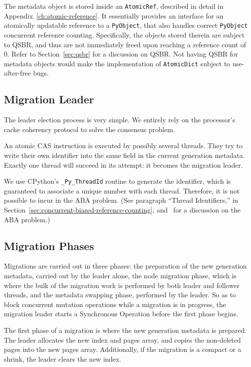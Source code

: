The metadata object is stored inside an \texttt{AtomicRef}, described in detail in Appendix~\ref{ch:atomic-reference}.
It essentially provides an interface for an atomically updatable reference to a \texttt{PyObject}, that also handles correct \texttt{PyObject} concurrent reference counting.
Specifically, the objects stored therein are subject to QSBR, and thus are not immediately freed upon reaching a reference count of 0.
Refer to Section~\ref{sec:qsbr} for a discussion on QSBR\@.
Not having QSBR for metadata objects would make the implementation of \texttt{AtomicDict} subject to use-after-free bugs.

\subsection{Migration Leader}\label{subsec:migration-leader}

The leader election process is very simple.
We entirely rely on the processor's cache coherency protocol to solve the consensus problem.

An atomic CAS instruction is executed by possibly several threads.
They try to write their own identifier into the same field in the current generation metadata.
Exactly one thread will succeed in its attempt: it becomes the migration leader.

We use CPython's \texttt{\_Py\_ThreadId} routine to generate the identifier, which is guaranteed to associate a unique number with each thread.
Therefore, it is not possible to incur in the ABA problem.
(See paragraph ``Thread Identifiers,'' in Section~\ref{sec:concurrent-biased-reference-counting}, and~\cite[\S10.6]{art-mp} for a discussion on the ABA problem.)

\subsection{Migration Phases}\label{subsec:migration-phases}

Migrations are carried out in three phases: the preparation of the new generation metadata, carried out by the leader alone, the node migration phase, which is where the bulk of the migration work is performed by both leader and follower threads, and the metadata swapping phase, performed by the leader.
So as to block concurrent mutation operations while a migration is in progress, the migration leader starts a Synchronous Operation before the first phase begins.

The first phase of a migration is where the new generation metadata is prepared.
The leader allocates the new index and pages array, and copies the non-deleted pages into the new pages array.
Additionally, if the migration is a compact or a shrink, the leader clears the new index.

